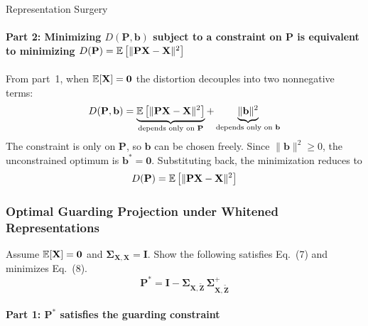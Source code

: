 \begin{question}{Representation Surgery}
\begin{subquestion}
\paragraph{Part 2: Minimizing $D(\mathbf{P}, \mathbf{b})$ subject to a constraint on $\mathbf{P}$ is equivalent to minimizing $D(\mathbf{P}) = \expectation\left[\|\mathbf{P}\mathbf{X} - \mathbf{X}\|^2\right]$}

From part~1, when $\expectation[\mathbf{X}] = \mathbf{0}$ the distortion decouples into two nonnegative terms:
\begin{equation}
    D(\mathbf{P}, \mathbf{b}) = \underbrace{\expectation\left[\|\mathbf{P}\mathbf{X} - \mathbf{X}\|^2\right]}_{\text{depends only on }\mathbf{P}} + \underbrace{\|\mathbf{b}\|^2}_{\text{depends only on }\mathbf{b}}
\end{equation}
The constraint is only on $\mathbf{P}$, so $\mathbf{b}$ can be chosen freely. Since $\|\mathbf{b}\|^2 \geq 0$, the unconstrained optimum is $\mathbf{b}^\ast = \mathbf{0}$. Substituting back, the minimization reduces to
\begin{equation}
    D(\mathbf{P}) = \expectation\left[\|\mathbf{P}\mathbf{X} - \mathbf{X}\|^2\right]
\end{equation}

\end{subquestion}

\begin{subquestion}

\subsubsection*{Optimal Guarding Projection under Whitened Representations}

Assume $\expectation[\mathbf{X}] = \mathbf{0}$ and $\boldsymbol{\Sigma}_{\mathbf{X}, \mathbf{X}} = \mathbf{I}$. Show the following satisfies Eq.~(7) and minimizes Eq.~(8).
\begin{equation}
    \mathbf{P}^\ast = \mathbf{I} - \boldsymbol{\Sigma}_{\mathbf{X}, \widetilde{\mathbf{Z}}}\, \boldsymbol{\Sigma}_{\mathbf{X}, \widetilde{\mathbf{Z}}}^+
\end{equation}

\paragraph{Part 1: $\mathbf{P}^\ast$ satisfies the guarding constraint}


\end{subquestion}
\end{question}
